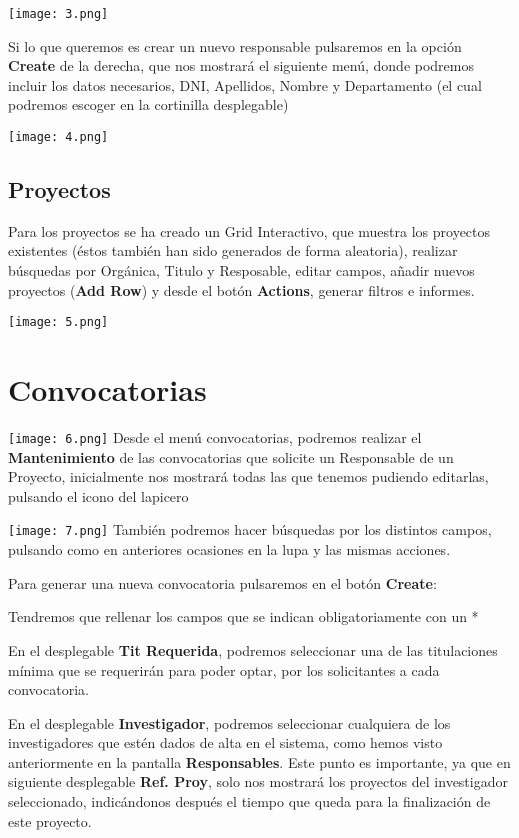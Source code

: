 \texttt{[image: 3.png]}

Si lo que queremos es crear un nuevo responsable pulsaremos en la opción
\textbf{Create} de la derecha, que nos mostrará el siguiente menú, donde
podremos incluir los datos necesarios, DNI, Apellidos, Nombre y
Departamento (el cual podremos escoger en la cortinilla desplegable)

\texttt{[image: 4.png]}

\subsection{Proyectos}\label{proyectos}

Para los proyectos se ha creado un Grid Interactivo, que muestra los
proyectos existentes (éstos también han sido generados de forma
aleatoria), realizar búsquedas por Orgánica, Titulo y Resposable, editar
campos, añadir nuevos proyectos (\textbf{Add Row}) y desde el botón
\textbf{Actions}, generar filtros e informes.

\texttt{[image: 5.png]}

\section{Convocatorias}\label{convocatorias}

\texttt{[image: 6.png]}
Desde el menú convocatorias, podremos realizar el \textbf{Mantenimiento} de las convocatorias que solicite un Responsable de un Proyecto, inicialmente nos mostrará todas las que tenemos pudiendo editarlas, pulsando el icono del lapicero

\texttt{[image: 7.png]}
También podremos hacer búsquedas por los distintos campos, pulsando como en anteriores ocasiones en la lupa y las mismas acciones.

Para generar una nueva convocatoria pulsaremos en el botón
\textbf{Create}:

Tendremos que rellenar los campos que se indican obligatoriamente con un *

En el desplegable \textbf{Tit Requerida}, podremos seleccionar una de las titulaciones mínima que se requerirán para poder optar, por los solicitantes a cada convocatoria.

En el desplegable \textbf{Investigador}, podremos seleccionar cualquiera de los investigadores que estén dados de alta en el sistema, como hemos visto anteriormente en la pantalla \textbf{Responsables}. Este punto es importante, ya que en siguiente desplegable \textbf{Ref. Proy}, solo nos mostrará los proyectos del investigador seleccionado, indicándonos después el tiempo que queda para la finalización de este proyecto.

